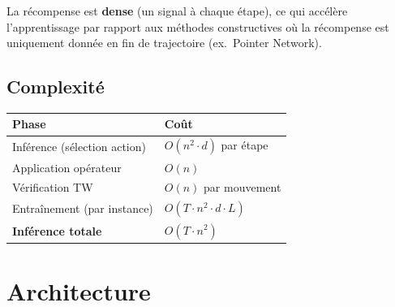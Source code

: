 \documentclass[11pt,a4paper]{article}
\begin{document}
\begin{tcolorbox}[remarque]
La récompense est \textbf{dense} (un signal à chaque étape), ce qui accélère
l'apprentissage par rapport aux méthodes constructives où la récompense est
uniquement donnée en fin de trajectoire (ex.\ Pointer Network).
\end{tcolorbox}

\subsection{Complexité}

\begin{center}
\begin{tabular}{ll}
  \toprule
  Phase & Coût \\
  \midrule
  Inférence (sélection action) & $O(n^2 \cdot d)$ par étape \\
  Application opérateur & $O(n)$ \\
  Vérification TW & $O(n)$ par mouvement \\
  Entraînement (par instance) & $O(T \cdot n^2 \cdot d \cdot L)$ \\
  \textbf{Inférence totale} & $O(T \cdot n^2)$ \\
  \bottomrule
\end{tabular}
\end{center}

\section{Architecture}
\end{document}
